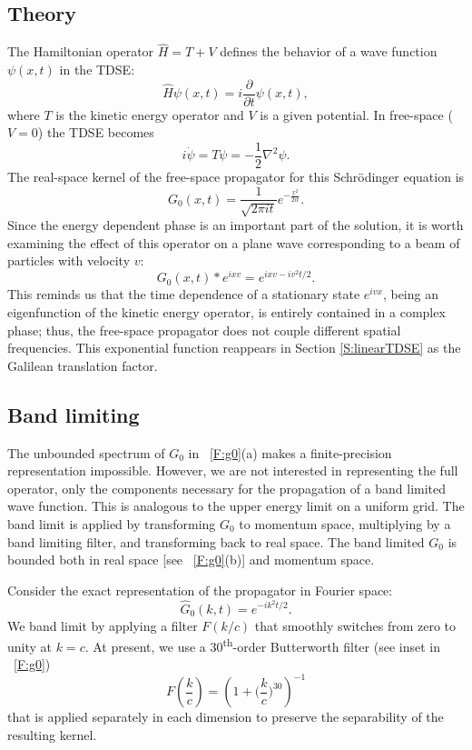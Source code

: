 \documentclass[review,letterpaper]{elsarticle}
\begin{document}
\subsection{Theory}
The Hamiltonian operator $\hat{H} = T+V$ defines the behavior of a wave function
$\psi (x,t)$ in the TDSE:
\begin{equation}
\hat{H}\psi (x,t)=i\frac{\partial }{\partial t}\psi (x,t),
\label{E:tdse}
\end{equation}
where $T$ is the kinetic energy operator and $V$ is a given potential.
In free-space ($V=0$) the TDSE becomes
\begin{equation}
i\dot{\psi } = T \psi = -{\frac{1}{2}}\nabla ^{2}\psi .
\end{equation}
The real-space kernel of the free-space propagator for this Schr\"odinger equation is
\begin{equation}
G_{0}(x,t)=\frac{1}{\sqrt{2\pi it}}e^{-{\frac{x^{2}}{2it}}}.
\end{equation}
Since the energy dependent phase is an important part of the solution, it is worth
examining the effect of this operator on a plane wave corresponding to a beam of
particles with velocity $v$:
\begin{equation}
G_{0}(x,t)\ast e^{ixv}=e^{ixv-iv^{2}t/2}.
\end{equation}
This reminds us that the time dependence of a stationary state $e^{ivx}$, being an
eigenfunction of the kinetic energy operator, is entirely contained in a complex phase;
thus, the free-space propagator does not couple different spatial frequencies. This
exponential function reappears in Section \ref{S:linearTDSE} as the Galilean
translation factor.


\subsection{Band limiting}
The unbounded spectrum of $G_0$ in \figurename~\ref{F:g0}(a) makes a finite-precision representation impossible.
However, we are not interested in representing the full operator, only the components necessary
for the propagation of a band limited wave function. This is analogous to the upper energy
limit on a uniform grid. The band limit is applied by transforming $G_0$ to momentum
space, multiplying by a band limiting filter, and transforming back to real space.
The band limited $G_0$ is bounded both in real space [see \figurename~\ref{F:g0}(b)] and momentum space.

Consider the exact representation of the propagator in Fourier space:
\begin{equation}
{\hat{G}}_{0}(k,t)=e^{-i k^2t/2}.
\end{equation}
We band limit by applying a filter $F(k/c)$ that smoothly switches from zero to unity at $k=c$.
At present, we use a 30\textsuperscript{th}-order Butterworth filter (see inset in \figurename~\ref{F:g0})
\begin{equation}\label{seq:refText5}
F(\frac k c)=\left(1+\bigg(\frac{k}{c}\bigg)^{30}\right)^{-1}
\end{equation}
that is applied separately in each dimension to preserve the separability
of the resulting kernel.
\end{document}
